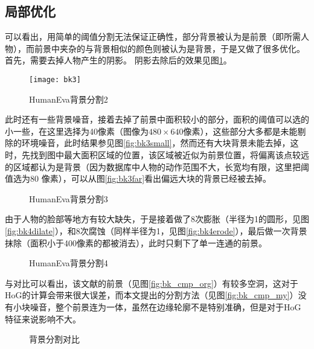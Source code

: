\subsection{局部优化}
可以看出，用简单的阈值分割无法保证正确性，部分背景被认为是前景（即所需人物），而前景中夹杂的与背景相似的颜色则被认为是背景，于是又做了很多优化。首先，需要去掉人物产生的阴影。%
阴影去除后的效果见图\ref{fig:bk2foot}。

\begin{figure}[htbp]
  \centering
  \texttt{[image: bk3]}
  \caption{HumanEva背景分割2}\label{fig:bk2foot}
\end{figure}

此时还有一些背景噪音，接着去掉了前景中面积较小的部分，面积的阈值可以选的小一些，在这里选择为40像素（图像为$480\times 640$像素），这些部分大多都是未能剔除的环境噪音，此时结果参见图\ref{fig:bk3small}，然而还有大块背景未能去掉，这时，先找到图中最大面积区域的位置，该区域被近似为前景位置，将偏离该点较远的区域都认为是背景（因为数据库中人物的动作范围不大，长宽均有限，这里把阈值选为80 像素），可以从图\ref{fig:bk3far}看出偏远大块的背景已经被去掉。

\begin{figure}[htbp]
  \centering
  \caption{HumanEva背景分割3}
\end{figure}

由于人物的脸部等地方有较大缺失，于是接着做了8次膨胀（半径为1的圆形，见图\ref{fig:bk4dilate}），和8次腐蚀（同样半径为1，见图\ref{fig:bk4erode}），最后做一次背景抹除（面积小于400像素的都被消去），此时只剩下了单一连通的前景。

\begin{figure}[htbp]
  \centering
  \caption{HumanEva背景分割4}
\end{figure}

与\cite{Poppe2007}对比可以看出，该文献的前景（见图\ref{fig:bk_cmp_org}）有较多空洞，这对于HoG的计算会带来很大误差，而本文提出的分割方法（见图\ref{fig:bk_cmp_my}）没有小块噪音，整个前景连为一体，虽然在边缘轮廓不是特别准确，但是对于HoG特征来说影响不大。

\begin{figure}[htbp]
  \centering
  \caption{背景分割对比}
\end{figure}

